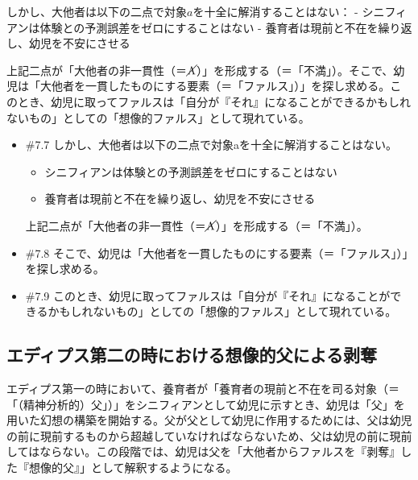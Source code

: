 しかし、大他者は以下の二点で対象\(a\)を十全に解消することはない： -
シニフィアンは体験との\mbox{予測誤差}をゼロにすることはない -
養育者は現前と不在を繰り返し、幼児を不安にさせる

上記二点が「大他者の非一貫性（＝\(\cancel{\textrm{A}}\)）」を形成する（＝「不満」）。そこで、幼児は「大他者を一貫したものにする要素（＝「ファルス」）」を探し求める。このとき、幼児に取ってファルスは「自分が『それ』になることができるかもしれないもの」としての「想像的ファルス」として現れている。

\begin{note}{}
  \begin{itemize}
    \tightlist
    \item{\#7.7}
      しかし、大他者は以下の二点で対象aを十全に解消することはない。
      \begin{itemize}
          \tightlist
          \item
          シニフィアンは体験との\mbox{予測誤差}をゼロにすることはない
          \item
          養育者は現前と不在を繰り返し、幼児を不安にさせる
        \end{itemize}
      上記二点が「大他者の非一貫性（＝$\cancel{\textrm{A}}$）」を形成する（＝「不満」）。
    \item{\#7.8}
      そこで、幼児は「大他者を一貫したものにする要素（＝「ファルス」）」を探し求める。
    \item{\#7.9}
      このとき、幼児に取ってファルスは「自分が『それ』になることができるかもしれないもの」としての「想像的ファルス」として現れている。
  \end{itemize}
\end{note}

\subsection{エディプス第二の時における想像的父による剥奪}\label{ux30a8ux30c7ux30a3ux30d7ux30b9ux7b2cux4e8cux306eux6642ux306bux304aux3051ux308bux60f3ux50cfux7684ux7236ux306bux3088ux308bux5265ux596a}

エディプス第一の時において、養育者が「養育者の現前と不在を司る対象（＝「（精神分析的）父」）」をシニフィアンとして幼児に示すとき、幼児は「父」を用いた幻想の構築を開始する。父が父として幼児に作用するためには、父は幼児の前に現前するものから超越していなければならないため、父は幼児の前に現前してはならない。この段階では、幼児は父を「大他者からファルスを『剥奪』した『想像的父』」として解釈するようになる。

